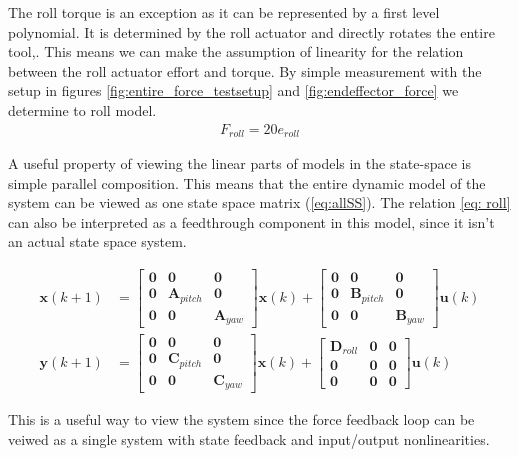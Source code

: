 The roll torque is an exception as it can be represented by a first level polynomial.
It is determined by the roll actuator and directly rotates the entire tool,.
This means we can make the assumption of linearity for the relation between the roll actuator effort and torque.  
By simple measurement with the setup in figures \ref{fig:entire_force_testsetup} and \ref{fig:endeffector_force} we determine to roll model.
\begin{align}\label{eq: roll}
F_{roll} = 20e_{roll}
\end{align}

A  useful property of viewing the linear parts of models in the state-space is simple parallel composition.
This means that the entire dynamic model of the system can be viewed as one state space matrix (\ref{eq:allSS}).
The relation \ref{eq: roll} can also be interpreted as a feedthrough component in this model, since it isn't an actual state space system.

\begin{align}\label{eq:allSS}
\mathbf{x}(k+1) &= 
\begin{bmatrix} \mathbf{0} & \mathbf{0} & \mathbf{0}\\
 \mathbf{0} & \mathbf{A}_{pitch} &\mathbf{0}\\
 \mathbf{0} &\mathbf{0} & \mathbf{A}_{yaw}  \end{bmatrix} 
 \mathbf{x}(k) + 
\begin{bmatrix} \mathbf{0} & \mathbf{0} & \mathbf{0}\\
 \mathbf{0} & \mathbf{B}_{pitch} &\mathbf{0}\\
 \mathbf{0} &\mathbf{0} & \mathbf{B}_{yaw}  \end{bmatrix} 
 \mathbf{u}(k)\\
\mathbf{y}(k+1) &= 
\begin{bmatrix} \mathbf{0} & \mathbf{0} & \mathbf{0}\\
 \mathbf{0} & \mathbf{C}_{pitch} &\mathbf{0}\\
 \mathbf{0} &\mathbf{0} & \mathbf{C}_{yaw}  \end{bmatrix} 
\mathbf{x}(k) + 
\begin{bmatrix} \mathbf{D}_{roll} & \mathbf{0} & \mathbf{0}\\
 \mathbf{0} & \mathbf{0} &\mathbf{0}\\
 \mathbf{0} &\mathbf{0} & \mathbf{0}  \end{bmatrix} 
  \mathbf{u}(k)
\end{align}

This is a useful way to view the system since the force feedback loop can be veiwed as a single system with state feedback and input/output nonlinearities.

